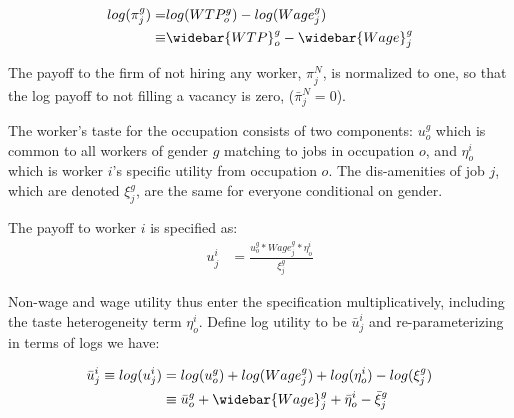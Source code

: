 \documentclass[11pt]{article}
\begin{document}

\begin{align} \label{logfirm}
  log(\pi^g_j)=&  log(WTP^g_o) -  log(Wage^g_j) \\ \nonumber
  \equiv & \widebar{WTP}^g_o - \widebar{Wage}^g_j
\end{align}

The payoff to the firm of not hiring any worker, $\pi^N_j$, is normalized to one, so that the log payoff to not filling a vacancy is zero, ($ \bar{\pi}^N_j = 0$).


The worker's taste for the occupation consists of two components: $u^g_o$ which is common to all workers of gender $g$ matching to jobs in occupation $o$, and $\eta^i_o$ which is worker $i$'s specific utility from occupation $o$. The dis-amenities of job $j$, which are denoted $\xi^g_j$, are the same for everyone conditional on gender.


The payoff to worker $i$ is specified as:
\begin{align} \label{worker}
u^i_j &= \frac{ u^g_o*Wage^g_j *  \eta^i_o } {\xi^g_j}    
\end{align}

Non-wage and wage utility thus enter the specification multiplicatively, including the taste heterogeneity term $\eta^i_o$. Define log utility to be $\bar{u}^{i}_j$ and re-parameterizing in terms of logs we have:

\begin{align} \label{logworker}
\bar{u}^{i}_j \equiv log(u^i_j) &= log(u^g_o) + log(Wage^g_j)  + log(\eta^i_o) - log(\xi^g_j)   \\ \nonumber
&\equiv  \bar{u}^{g}_o + \widebar{Wage}^g_j   + \bar{\eta}^i_o - \bar{\xi}^g_j 
\end{align}
\end{document}
